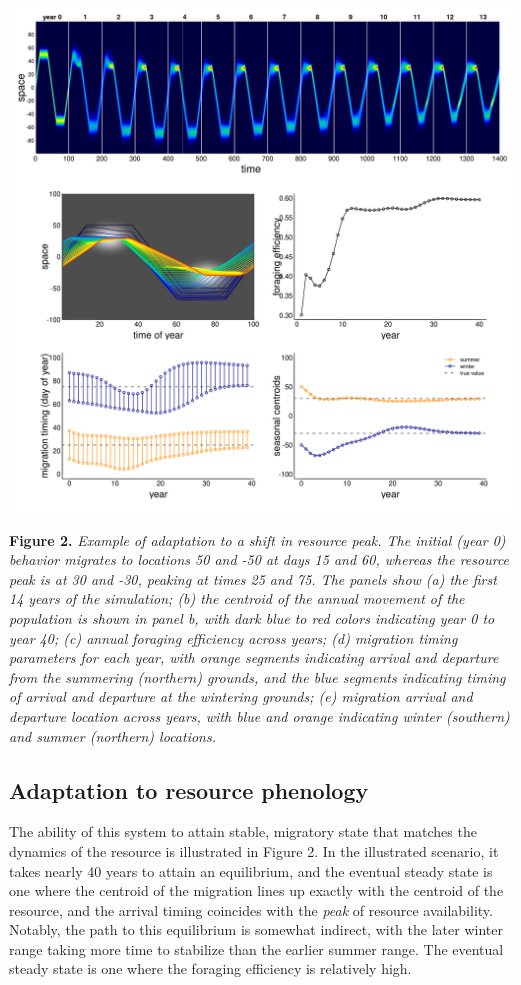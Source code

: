 \documentclass[12pt]{article}
\begin{document}
\includegraphics{figures/example1_adaptation.png}

\textbf{Figure 2.} \emph{Example of adaptation to a shift in resource
peak. The initial (year 0) behavior migrates to locations 50 and -50 at
days 15 and 60, whereas the resource peak is at 30 and -30, peaking at
times 25 and 75. The panels show (a) the first 14 years of the
simulation; (b) the centroid of the annual movement of the population is
shown in panel b, with dark blue to red colors indicating year 0 to year
40; (c) annual foraging efficiency across years; (d) migration timing
parameters for each year, with orange segments indicating arrival and
departure from the summering (northern) grounds, and the blue segments
indicating timing of arrival and departure at the wintering grounds; (e)
migration arrival and departure location across years, with blue and
orange indicating winter (southern) and summer (northern) locations.}

\hypertarget{adaptation-to-resource-phenology}{%
\subsection{Adaptation to resource
phenology}\label{adaptation-to-resource-phenology}}

The ability of this system to attain stable, migratory state that
matches the dynamics of the resource is illustrated in Figure 2. In the
illustrated scenario, it takes nearly 40 years to attain an equilibrium,
and the eventual steady state is one where the centroid of the migration
lines up exactly with the centroid of the resource, and the arrival
timing coincides with the \emph{peak} of resource availability. Notably,
the path to this equilibrium is somewhat indirect, with the later winter
range taking more time to stabilize than the earlier summer range. The
eventual steady state is one where the foraging efficiency is relatively
high.
\end{document}
